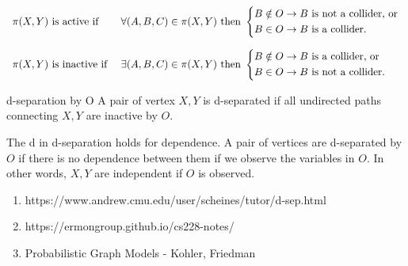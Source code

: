 \[ 
	\begin{array}{ll}
	\pi(X,Y) \text{ is active if } & \forall (A,B,C) \in \pi (X,Y)  \text{ then }
	\begin{dcases*}
    	B \notin O \rightarrow B  \text{ is not a collider, or}\\
		B \in O \rightarrow B \text{ is a collider. }
	\end{dcases*}\\[2em]	
	\pi(X,Y) \text{ is inactive if } & \exists (A,B,C) \in \pi (X,Y)  \text{ then }
	\begin{dcases*}
    	B \notin O \rightarrow B  \text{ is a collider, or}\\
		B \in O \rightarrow B \text{ is not a collider. }
	\end{dcases*}		
	\end{array}
\]

\begin{definition}{d-separation by O}
A pair of vertex $X,Y$ is d-separated if all undirected paths connecting $X,Y$ are inactive by $O$.
\end{definition}

The d in d-separation holds for dependence. A pair of vertices are d-separated by $O$ if there is no dependence between them if we observe the variables in $O$. In other words, $X,Y$ are independent if $O$ is observed.




\begin{enumerate}
\item{https://www.andrew.cmu.edu/user/scheines/tutor/d-sep.html}
\item{https://ermongroup.github.io/cs228-notes/}
\item{Probabilistic Graph Models - Kohler, Friedman}
\end{enumerate}